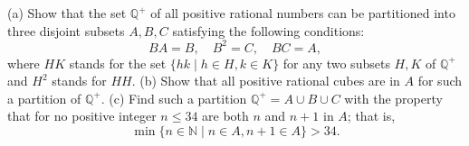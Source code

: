 (a) Show that the set $\mathbb{Q}^{+}$ of all positive rational numbers can be partitioned into three disjoint subsets $A,B,C$ satisfying the following conditions:
\[
BA=B,\quad B^{2}=C,\quad BC=A,
\]
where $HK$ stands for the set $\{hk\mid h\in H, k\in K\}$ for any two subsets $H,K$ of $\mathbb{Q}^{+}$ and $H^{2}$ stands for $HH$.
(b) Show that all positive rational cubes are in $A$ for such a partition of $\mathbb{Q}^{+}$.
(c) Find such a partition $\mathbb{Q}^{+}=A\cup B\cup C$ with the property that for no positive integer $n\leq 34$ are both $n$ and $n+1$ in $A$; that is,
\[
\min\{n\in\mathbb{N}\mid n\in A, n+1\in A\}>34.
\]
